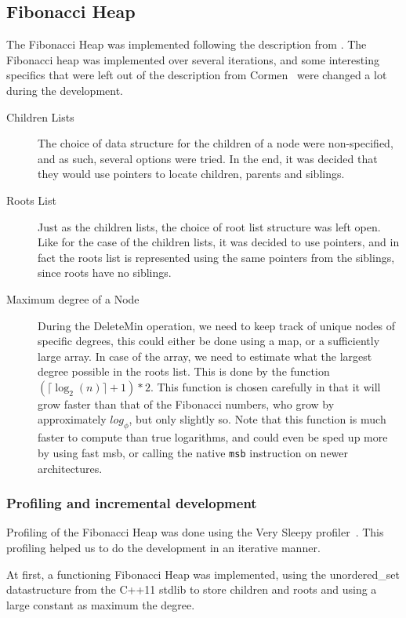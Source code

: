 \subsection{Fibonacci Heap}

The Fibonacci Heap was implemented following the description from \cite{Cormen}. The Fibonacci heap was implemented over several iterations, and some interesting specifics that were left out of the description from Cormen~\cite{Cormen} were changed a lot during the development.

\begin{description}
\item[Children Lists] The choice of data structure for the children of a node were non-specified, and as such, several options were tried. In the end, it was decided that they would use pointers to locate children, parents and siblings.
\item[Roots List] Just as the children lists, the choice of root list structure was left open. Like for the case of the children lists, it was decided to use pointers, and in fact the roots list is represented using the same pointers from the siblings, since roots have no siblings.
\item[Maximum degree of a Node] During the DeleteMin operation, we need to keep track of unique nodes of specific degrees, this could either be done using a map, or a sufficiently large array. In case of the array, we need to estimate what the largest degree possible in the roots list. This is done by the function $(\lceil \log_2 (n) \rceil +1)*2$. This function is chosen carefully in that it will grow faster than that of the Fibonacci numbers, who grow by approximately $log_\phi$, but only slightly so. Note that this function is much faster to compute than true logarithms, and could even be sped up more by using fast msb, or calling the native \verb#msb# instruction on newer architectures.
\end{description}

\subsubsection{Profiling and incremental development}

Profiling of the Fibonacci Heap was done using the Very Sleepy profiler~\cite{sleepy}. This profiling helped us to do the development in an iterative manner.

At first, a functioning Fibonacci Heap was implemented, using the unordered\_set datastructure from the C++11 stdlib to store children and roots and using a large constant as maximum the degree.

